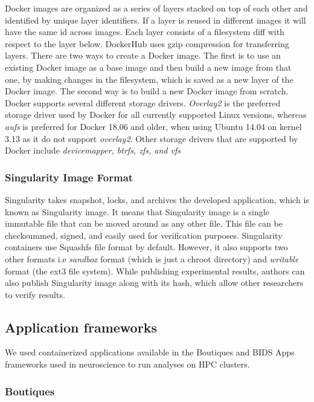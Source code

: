 \documentclass[a4paper,num-refs]{oup-contemporary}
\begin{document}
Docker images are organized as a series of layers stacked on top of each
other and identified by unique layer identifiers. If a layer is reused
in different images it will
have the same id across images. Each layer consists of a filesystem diff
with respect to the layer below. DockerHub uses gzip compression for
transferring layers. There are two ways to create a Docker image. The
first is to use an existing Docker image as a base image and then build a
new image from that one, by making changes in the filesystem, which is
saved as a new layer of the Docker image. The second way is to build a new
Docker image from scratch. Docker supports several different storage drivers.
\textit{Overlay2} is the preferred storage driver used by Docker for all currently
supported Linux versions, whereas \textit{aufs} is preferred for Docker 18.06 and
older, when using Ubuntu 14.04 on kernel 3.13 as it do not support \textit{overlay2}.
Other storage drivers that are supported by Docker include \textit{devicemapper, btrfs,
zfs, and vfs}

\subsubsection{Singularity Image Format}

Singularity takes snapshot, locks, and archives the developed application,
which is known as Singularity image.
It means that Singularity image is a single immutable file that can be moved around as
any other file. This file can be checksummed, signed, and easily
used for verification purposes. Singularity containers use Squashfs file format
by default. However, it also supports two other formats i.e \textit{sandbox} format
(which is just a chroot
directory) and \textit{writable} format (the ext3 file system).
While publishing experimental results, authors can also publish Singularity
image along with its hash, which allow other researchers to verify results.

\subsection{Application frameworks}

We used containerized applications available in the Boutiques and BIDS Apps
frameworks used in neuroscience to run analyses on HPC clusters. 

\subsubsection{Boutiques}
\end{document}
